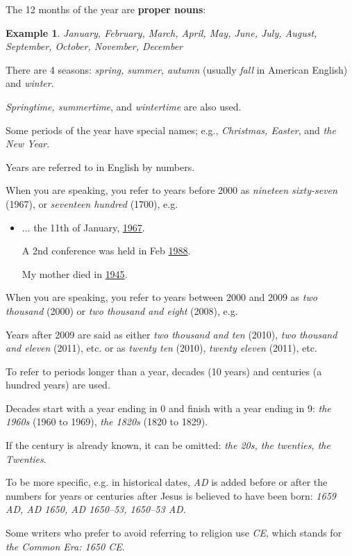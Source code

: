 \documentclass[oneside]{book}
\numberwithin{equation}{section}
\newtheorem{example}{Example}[section]
\begin{document}
%
\noindent{} The 12 months of the year are \textbf{proper nouns}:
\begin{example}
    January, February, March, April, May, June, July, August, September, October, November, December
\end{example}
There are 4 seasons: \textit{spring, summer, autumn} (usually \textit{fall} in American English) and \textit{winter}.

\textit{Springtime, summertime}, and \textit{wintertime} are also used.

%
Some periods of the year have special names; e.g., \textit{Christmas, Easter}, and \textit{the New Year}.

%
\noindent{} Years are referred to in English by numbers.

When you are speaking, you refer to years before 2000 as \textit{nineteen sixty-seven} (1967), or \textit{seventeen hundred} (1700), e.g.
\begin{itemize}
    \item $\ldots$ the 11th of January, \underline{1967}.
    
    A 2nd conference was held in Feb \underline{1988}.
    
    My mother died in \underline{1945}.
\end{itemize}
When you are speaking, you refer to years between 2000 and 2009 as \textit{two thousand} (2000) or \textit{two thousand and eight} (2008), e.g.

%
Years after 2009 are said as either \textit{two thousand and ten} (2010), \textit{two thousand and eleven} (2011), etc. or as \textit{twenty ten} (2010), \textit{twenty eleven} (2011), etc.

%
To refer to periods longer than a year, decades (10 years) and centuries (a hundred years) are used.

Decades start with a year ending in 0 and finish with a year ending in 9: \textit{the 1960s} (1960 to 1969), \textit{the 1820s} (1820 to 1829).

If the century is already known, it can be omitted: \textit{the 20s, the twenties, the Twenties}.

%
To be more specific, e.g. in historical dates, \textit{AD} is added before or after the numbers for years or centuries after Jesus is believed to have been born: \textit{1659 AD, AD 1650, AD 1650--53, 1650--53 AD}.

Some writers who prefer to avoid referring to religion use \textit{CE}, which stands for \textit{the Common Era: 1650 CE}.
\end{document}
